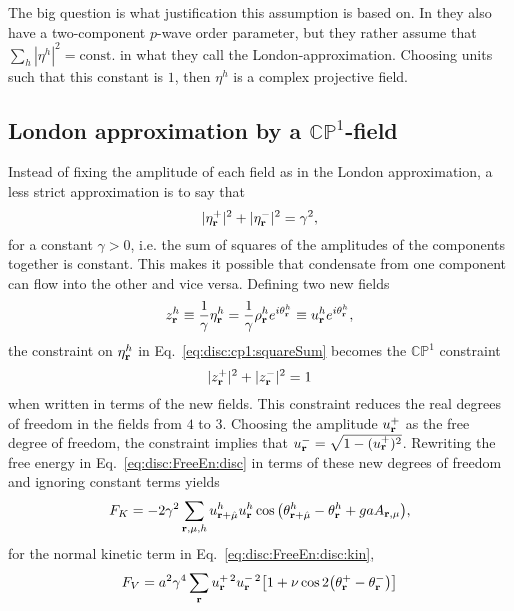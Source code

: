 The big question is what justification this assumption is based on. In \cite{shimizu12} they also have a two-component $p$-wave order parameter, but they rather assume that
$\sum_h|\eta^h|^2 = \text{const.}$ in what they call the London-approximation. Choosing units such that this constant is $1$, then $\eta^h$ is a complex projective field.

\subsection{London approximation by a $\mathbb{CP}^1$-field}

Instead of fixing the amplitude of each field as in the London approximation, a less strict approximation is to say that
\begin{equation}
  |\eta^+_{\boldsymbol{\mathbf{r}}}|^2 + |\eta^-_{\boldsymbol{\mathbf{r}}}|^2 = \gamma^2,
  \label{eq:disc:cp1:squareSum}
\end{equation}
for a constant $\gamma>0$, i.e. the sum of squares of the amplitudes of the components together is constant. This makes it possible that condensate from one component can flow into the other
and vice versa. Defining two new fields
\begin{equation}
  z^h_{\boldsymbol{\mathbf{r}}} \equiv \frac{1}{\gamma}\eta^h_{\boldsymbol{\mathbf{r}}} = \frac{1}{\gamma}\rho^h_{\boldsymbol{\mathbf{r}}}e^{i\theta^h_{\boldsymbol{\mathbf{r}}}} \equiv u^h_{\boldsymbol{\mathbf{r}}}e^{i\theta^h_{\boldsymbol{\mathbf{r}}}},
  \label{eq:disc:cp1:zFields}
\end{equation}
the constraint on $\eta^h_{\boldsymbol{\mathbf{r}}}$ in Eq.~\eqref{eq:disc:cp1:squareSum} becomes the $\mathbb{CP}^1$ constraint
\begin{equation}
  |z^+_{\boldsymbol{\mathbf{r}}}|^2 + |z^-_{\boldsymbol{\mathbf{r}}}|^2 = 1
  \label{eq:disc:cp1:cp1Constraint}
\end{equation}
when written in terms of the new fields. This constraint reduces the real degrees of freedom in the fields from $4$ to $3$. Choosing the amplitude $u^+_{\boldsymbol{\mathbf{r}}}$ as the free degree of freedom,
the constraint implies that $u^-_{\boldsymbol{\mathbf{r}}}= \sqrt{1-(u^+_{\boldsymbol{\mathbf{r}}})^2}$. Rewriting the free energy in Eq.~\eqref{eq:disc:FreeEn:disc} in terms of these new degrees of freedom and ignoring constant terms yields
\begin{equation}
  F_K = -2\gamma^2\sum_{{\boldsymbol{\mathbf{r}}},\mu,h}u^h_{{\boldsymbol{\mathbf{r}}}+\hat{\mu}}u^h_{\boldsymbol{\mathbf{r}}}\cos\big(\theta^h_{{\boldsymbol{\mathbf{r}}}+\hat{\mu}} - \theta^h_{\boldsymbol{\mathbf{r}}} + gaA_{{\boldsymbol{\mathbf{r}}},\mu}\big),
  \label{eq:disc:cp1:FK}
\end{equation}
for the normal kinetic term in Eq.~\eqref{eq:disc:FreeEn:disc:kin},
\begin{equation}
  F_V = a^2\gamma^4\sum_{\boldsymbol{\mathbf{r}}}u^{+\,2}_{\boldsymbol{\mathbf{r}}}u^{-\,2}_{\boldsymbol{\mathbf{r}}}\big[1+\nu\cos 2\big(\theta^+_{\boldsymbol{\mathbf{r}}}-\theta^-_{\boldsymbol{\mathbf{r}}}\big)\big]
  \label{eq:disc:cp1:FV}
\end{equation}
